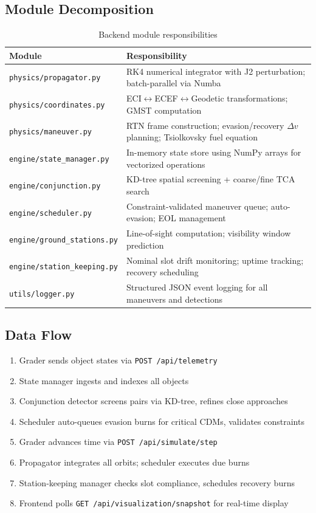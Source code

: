 \documentclass[11pt, a4paper]{article}
\begin{document}
\subsection{Module Decomposition}

\begin{table}[H]
\centering
\caption{Backend module responsibilities}
\begin{tabularx}{\textwidth}{l X}
\toprule
\textbf{Module} & \textbf{Responsibility} \\
\midrule
\texttt{physics/propagator.py} & RK4 numerical integrator with J2 perturbation; batch-parallel via Numba \\
\texttt{physics/coordinates.py} & ECI$\leftrightarrow$ECEF$\leftrightarrow$Geodetic transformations; GMST computation \\
\texttt{physics/maneuver.py} & RTN frame construction; evasion/recovery $\Delta v$ planning; Tsiolkovsky fuel equation \\
\texttt{engine/state\_manager.py} & In-memory state store using NumPy arrays for vectorized operations \\
\texttt{engine/conjunction.py} & KD-tree spatial screening + coarse/fine TCA search \\
\texttt{engine/scheduler.py} & Constraint-validated maneuver queue; auto-evasion; EOL management \\
\texttt{engine/ground\_stations.py} & Line-of-sight computation; visibility window prediction \\
\texttt{engine/station\_keeping.py} & Nominal slot drift monitoring; uptime tracking; recovery scheduling \\
\texttt{utils/logger.py} & Structured JSON event logging for all maneuvers and detections \\
\bottomrule
\end{tabularx}
\end{table}

\subsection{Data Flow}

\begin{enumerate}[nosep]
  \item Grader sends object states via \texttt{POST /api/telemetry}
  \item State manager ingests and indexes all objects
  \item Conjunction detector screens pairs via KD-tree, refines close approaches
  \item Scheduler auto-queues evasion burns for critical CDMs, validates constraints
  \item Grader advances time via \texttt{POST /api/simulate/step}
  \item Propagator integrates all orbits; scheduler executes due burns
  \item Station-keeping manager checks slot compliance, schedules recovery burns
  \item Frontend polls \texttt{GET /api/visualization/snapshot} for real-time display
\end{enumerate}
\end{document}
